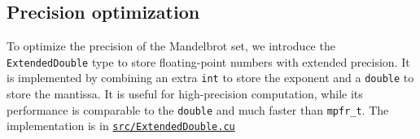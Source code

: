 \subsection{Precision optimization}\label{subsec:precision-optimization}

To optimize the precision of the Mandelbrot set, we introduce the \texttt{ExtendedDouble}
type to store floating-point numbers with extended precision.
It is implemented by combining an extra \texttt{int} to store the exponent and a \texttt{double}
to store the mantissa.
It is useful for high-precision computation, while its performance is comparable to the \texttt{double}
and much faster than \texttt{mpfr\_t}.
The implementation is in \href{https://github.com/AI1379/MandelbrotSet/blob/master/src/ExtendedDouble.cu}
{\texttt{src/ExtendedDouble.cu}}